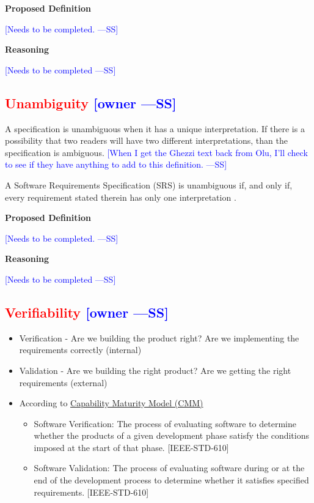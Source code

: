 \documentclass[letterpaper,cleveref]{lipics-v2019}
\newcommand{\authornote}[3]{\textcolor{#1}{[#3 ---#2]}}
\newcommand{\authornote}[3]{}
\newcommand{\wss}[1]{\authornote{blue}{SS}{#1}} %
\newcommand{\notdone}[1]{\textcolor{red}{#1}}
\theoremstyle{definition}
\begin{document}
\noindent \textbf{Proposed Definition} 

\wss{Needs to be completed.}

\noindent \textbf{Reasoning}

\wss{Needs to be completed}

\subsection{\notdone{Unambiguity} \wss{owner}}

A specification is unambiguous when it has a unique interpretation.  If there is
a possibility that two readers will have two different interpretations, than the
specification is ambiguous.  \wss{When I get the Ghezzi text back from Olu, I'll
  check to see if they have anything to add to this definition.}

A Software Requirements Specification (SRS) is unambiguous if, and only if,
every requirement stated therein has only one interpretation \citep{IEEE1998}.

\noindent \textbf{Proposed Definition} 

\wss{Needs to be completed.}

\noindent \textbf{Reasoning}

\wss{Needs to be completed}

\subsection{\notdone{Verifiability} \wss{owner}}

\begin{itemize}

\item Verification - Are we building the product right?  Are we implementing the
  requirements correctly (internal)
\item Validation - Are we building the right product? Are we getting the right
  requirements (external)
\item According to
  \href{https://en.wikipedia.org/wiki/Software_verification_and_validation}{Capability
    Maturity Model (CMM)}
\begin{itemize}
\item 
    Software Verification: The process of evaluating software to determine
    whether the products of a given development phase satisfy the conditions
    imposed at the start of that phase. [IEEE-STD-610]
  \item Software Validation: The process of evaluating software during or at the
    end of the development process to determine whether it satisfies specified
    requirements. [IEEE-STD-610] 
\end{itemize}
\end{itemize}
\end{document}
